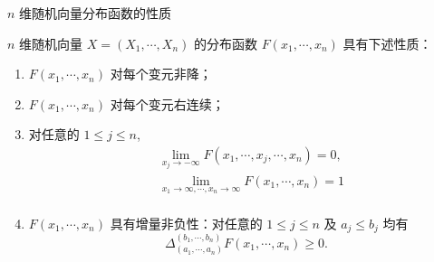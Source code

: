 \documentclass[Prob-All.tex]{subfiles}
\begin{document}
\begin{frame}{$n$ 维随机向量分布函数的性质}
	\vspace{-0.15cm}
	\begin{thm}
	 	$n$ 维随机向量 $X=\left (X_1,\cdots ,X_n \right)$ 的分布函数 $F\left ( x_1,\cdots ,x_n \right)$ 具有下述性质：
		\begin{enumerate}[<+-|alert@+>]
			\item $F\left (x_1,\cdots ,x_n \right)$ 对每个变元非降；
			\item $F\left (x_1,\cdots ,x_n \right)$ 对每个变元右连续；
			\item 对任意的 $1\leq j\leq n$, $$
			\begin{aligned}
				&\lim_{x_j\rightarrow -\infty} F\left( x_1,\cdots, x_j,\cdots,x_n \right) =0,\\
				&\lim_{x_1\rightarrow \infty ,\cdots ,x_n\rightarrow \infty} F\left( x_1,\cdots ,x_n \right) =1\\
			\end{aligned}
			$$
			\item $F\left (x_1,\cdots ,x_n\right)$ 具有增量非负性：对任意的 $1\leq j\leq n$ 及 $a_j\leqslant b_j$ 均有 %
			$$
			\Delta_{\left(a_{1}, \cdots, a_{n}\right)}^{\left(b_{1}, \cdots, b_{n}\right)} F(x_1,\cdots,x_n)\geq 0.
			$$
		\end{enumerate}
	\end{thm}

\end{frame}
\end{document}
